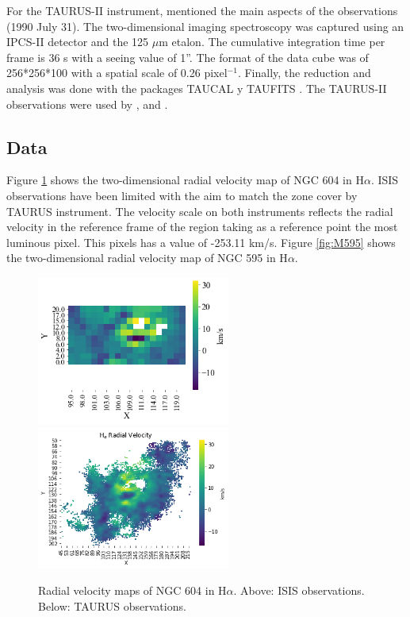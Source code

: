 \documentclass[fleqn,usenatbib]{mnras}
\begin{document}
For the TAURUS-II instrument, \cite{sabalisck1995supersonic} mentioned the main aspects of the observations (1990 July 31). The two-dimensional imaging spectroscopy was captured using an IPCS-II detector and the 125 $\mu$m etalon. The cumulative integration time per frame is 36 s with a seeing value of 1''. The format of the data cube was of 256*256*100 with a spatial scale of 0.26 pixel$^{-1}$. Finally, the reduction and analysis was done with the packages TAUCAL y TAUFITS \citep{1992ASPC...25..445L}.
The TAURUS-II observations were used by \cite{sabalisck1995supersonic}, \cite{tanco1997} and \cite{2019arXiv191203543M}.

\subsection{Data}

Figure \ref{fig:M604} shows the two-dimensional radial velocity map of NGC 604 in H$\alpha$. ISIS observations have been limited with the aim to match the zone cover by TAURUS instrument. The velocity scale on both instruments reflects the radial velocity in the reference frame of the region taking as a  reference point the most luminous pixel. This pixels has a value of -253.11 km/s. Figure \ref{fig:M595} shows the two-dimensional radial velocity map of NGC 595 in H$\alpha$.

\begin{figure}
\centering 
\includegraphics[width=2.5in]{Figures/6ISIS.png}
\includegraphics[width=2.5in]{Figures/6TAU.png}
\caption{Radial velocity maps of NGC 604 in H$\alpha$. Above: ISIS observations. Below: TAURUS observations. }
\label{fig:M604}
\end{figure}
\end{document}
